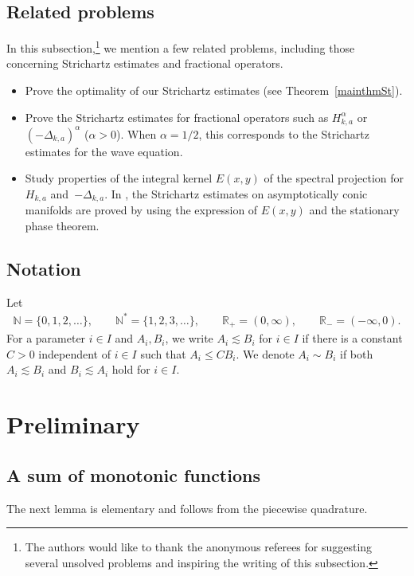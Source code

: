 \documentclass[10pt,a4paper]{article}
\numberwithin{equation}{section}
\def\R{\mathbb{R}}%
\def\a{\alpha}
\begin{document}
\subsection{Related problems}

In this subsection,\footnote{The authors would like to thank the anonymous referees for suggesting several unsolved problems and inspiring the writing of this subsection.} we mention a few related problems, including those concerning Strichartz estimates and fractional operators.
\begin{itemize}\itemsep=0pt
\item Prove the optimality of our Strichartz estimates (see Theorem~\ref{mainthmSt}).
\item Prove the Strichartz estimates for fractional operators such as $H_{k,a}^{\a}$ or $(-\Delta_{k,a})^{\a}$ ($\a>0$). When $\a=1/2$, this corresponds to the Strichartz estimates for the wave equation.
\item Study properties of the integral kernel $E(x,y)$ of the spectral projection for $H_{k,a}$ and~$-\Delta_{k,a}$. In \cite{HZ}, the Strichartz estimates on asymptotically conic manifolds are proved by using the expression of $E(x,y)$ and the stationary phase theorem.
\end{itemize}

\subsection{Notation}
Let
\begin{align*}
\mathbb{N}=\{0,1,2,\hdots\},\qquad \mathbb{N}^*=\{1,2,3,\hdots\}, \qquad \R_{+}=(0,\infty),\qquad \R_-=(-\infty,0).
\end{align*}
For a parameter $i\in I$ and $A_i,B_i$, we write $A_i\lesssim B_i$ for $i\in I$ if there is a constant $C>0$ independent of $i\in I$ such that $A_i\leq CB_i$. We denote $A_i\sim B_i$ if both $A_i\lesssim B_i$ and $B_i\lesssim A_i$ hold for $i\in I$.

\section{Preliminary}

\subsection{A sum of monotonic functions}

The next lemma is elementary and follows from the piecewise quadrature.
\end{document}
